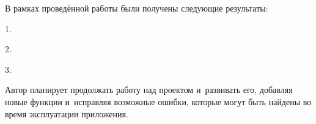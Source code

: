 
В рамках проведённой работы были получены следующие результаты:
\begin{dashitemize}
  \item 1.
  \item 2.
  \item 3.
\end{dashitemize}

\newpage

Автор планирует продолжать работу над проектом и~развивать его, добавляя новые функции и~исправляя возможные ошибки, которые могут быть найдены во время эксплуатации приложения.

\newpage